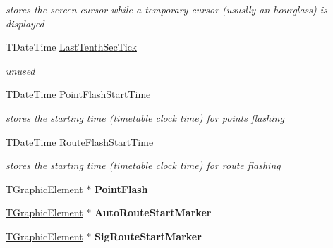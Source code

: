 \begin{DoxyCompactItemize}
\begin{DoxyCompactList}\small\item\em stores the screen cursor while a temporary cursor (ususlly an hourglass) is displayed \end{DoxyCompactList}\item 
\mbox{\label{class_t_interface_ad6dd127fe91cb3d461ad30cd1113e071}} 
T\+Date\+Time \mbox{\hyperlink{class_t_interface_ad6dd127fe91cb3d461ad30cd1113e071}{Last\+Tenth\+Sec\+Tick}}
\begin{DoxyCompactList}\small\item\em unused \end{DoxyCompactList}\item 
\mbox{\label{class_t_interface_a56a0ad081584befbe2b1c23eb5d0cc4c}} 
T\+Date\+Time \mbox{\hyperlink{class_t_interface_a56a0ad081584befbe2b1c23eb5d0cc4c}{Point\+Flash\+Start\+Time}}
\begin{DoxyCompactList}\small\item\em stores the starting time (timetable clock time) for points flashing \end{DoxyCompactList}\item 
\mbox{\label{class_t_interface_afa6d3ccd0b0978da6bc9021502f5ee60}} 
T\+Date\+Time \mbox{\hyperlink{class_t_interface_afa6d3ccd0b0978da6bc9021502f5ee60}{Route\+Flash\+Start\+Time}}
\begin{DoxyCompactList}\small\item\em stores the starting time (timetable clock time) for route flashing \end{DoxyCompactList}\item 
\mbox{\label{class_t_interface_ae6c61029b7dffb6c7605afe6ab7962fa}} 
\mbox{\hyperlink{class_t_graphic_element}{T\+Graphic\+Element}} $\ast$ {\bfseries Point\+Flash}
\item 
\mbox{\label{class_t_interface_a7265dd2213c3e1547c08b40dcbfc5960}} 
\mbox{\hyperlink{class_t_graphic_element}{T\+Graphic\+Element}} $\ast$ {\bfseries Auto\+Route\+Start\+Marker}
\item 
\mbox{\label{class_t_interface_a754caf4d08b809606767d38af81f7709}} 
\mbox{\hyperlink{class_t_graphic_element}{T\+Graphic\+Element}} $\ast$ {\bfseries Sig\+Route\+Start\+Marker}

\end{DoxyCompactItemize}
